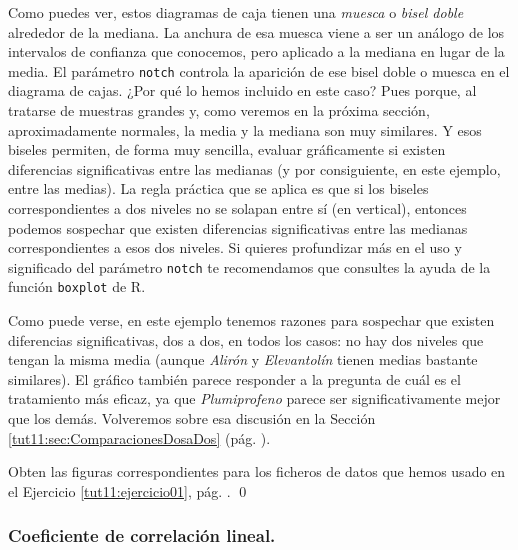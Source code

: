 \documentclass[10pt,a4paper]{article}\usepackage[]{graphicx}\usepackage[]{color}
\newcounter {cont01}
\begin{document}
Como puedes ver, estos diagramas de caja tienen una {\em muesca} o {\em bisel doble} alrededor de la mediana. La anchura de esa muesca viene a ser un análogo de los intervalos de confianza que conocemos, pero aplicado a la mediana en lugar de la media. El parámetro {\tt notch} controla la aparición de ese bisel doble o muesca en el diagrama de cajas. ¿Por qué lo hemos incluido en este caso? Pues porque, al tratarse de muestras grandes y, como veremos en la próxima sección, aproximadamente normales, la media y la mediana son muy similares. Y esos biseles permiten, de forma muy sencilla, evaluar gráficamente si existen diferencias significativas entre las medianas (y por consiguiente, en este ejemplo, entre las medias). La regla práctica que se aplica es que si los biseles correspondientes a dos niveles no se solapan entre sí (en vertical), entonces podemos sospechar que existen diferencias significativas entre las medianas correspondientes a esos dos niveles. Si quieres profundizar más en el uso y significado del parámetro {\tt notch} te recomendamos que consultes la ayuda de la función {\tt boxplot} de R.

Como puede verse, en este ejemplo tenemos razones para sospechar que existen diferencias significativas, dos a dos, en todos los casos: no hay dos niveles que tengan la misma media (aunque {\em Alirón} y {\em Elevantolín} tienen medias bastante similares). El gráfico también parece responder a la pregunta de cuál es el tratamiento más eficaz, ya que {\em Plumiprofeno} parece ser significativamente mejor que los demás. Volveremos sobre esa discusión en la Sección \ref{tut11:sec:ComparacionesDosaDos} (pág. \pageref{tut11:sec:ComparacionesDosaDos}).

\begin{ejercicio}
\label{tut11:ejercicio02}
Obten las figuras correspondientes para los ficheros de datos que hemos usado en el Ejercicio \ref{tut11:ejercicio01}, pág. \pageref{tut11:ejercicio01}.
\qed
\end{ejercicio}


\subsubsection*{Coeficiente de correlación lineal.}
\label{tut11:subsubsec:CoeficienteCorrelacionLineal}
\end{document}
